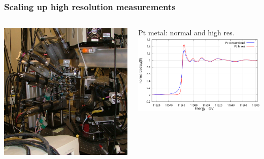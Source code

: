 \documentclass[10pt, xcolor=x11names, compress]{beamer}
\begin{document}
\begin{frame}
  \frametitle{Scaling up high resolution measurements}
  \begin{columns}
    \begin{column}{0.6\linewidth}
      \begin{center}
        \includegraphics[width=0.8\linewidth]{pses/hires/bla_array.jpg}
      \end{center}
    \end{column}
    \begin{column}{0.4\linewidth}
      \begin{center}
        \scriptsize
        Pt metal: normal and high res.\\
        \includegraphics[width=0.95\linewidth]{pses/hires/pt_hi_res.png}\\[3ex]

\end{center}
\end{column}
\end{columns}
\end{frame}
\end{document}
